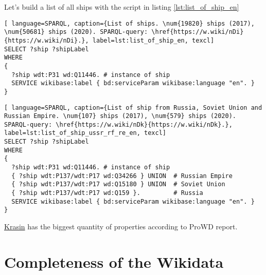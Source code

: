 Let's build a list of all ships with the script in listing \ref{lst:list_of_ship_en}

\begin{lstlisting}[ language=SPARQL, caption={List of ships. \num{19820} ships (2017), \num{50681} ships (2020). SPARQL-query: \href{https://w.wiki/nDi}{https://w.wiki/nDi}.}, label=lst:list_of_ship_en, texcl]
SELECT ?ship ?shipLabel
WHERE
{
  ?ship wdt:P31 wd:Q11446. # instance of ship
  SERVICE wikibase:label { bd:serviceParam wikibase:language "en". }
}
\end{lstlisting}

  
\begin{lstlisting}[ language=SPARQL, caption={List of ship from Russia, Soviet Union and Russian Empire. \num{107} ships (2017), \num{579} ships (2020). SPARQL-query: \href{https://w.wiki/nDk}{https://w.wiki/nDk}.}, label=lst:list_of_ship_ussr_rf_re_en, texcl]
SELECT ?ship ?shipLabel
WHERE
{
  ?ship wdt:P31 wd:Q11446. # instance of ship
  { ?ship wdt:P137/wdt:P17 wd:Q34266 } UNION  # Russian Empire
  { ?ship wdt:P137/wdt:P17 wd:Q15180 } UNION  # Soviet Union
  { ?ship wdt:P137/wdt:P17 wd:Q159 }.         # Russia
  SERVICE wikibase:label { bd:serviceParam wikibase:language "en". }
}
\end{lstlisting}

\href{https://www.wikidata.org/wiki/Q281147}{Krasin} has the biggest quantity of properties according to ProWD report\cite{ProWD_ru_ships}.
  
\begin{marginfigure}[0.0cm]
  {
    \setlength{\fboxsep}{0pt}%
    \setlength{\fboxrule}{1pt}%
  }
  \caption[Soviet destroyer project 7]{Postage stamp with a picture of Famous Soviet destroyer project 7.}%
  \label{fig:quiz_question_ship}%
\end{marginfigure}


\section{Completeness of the Wikidata}

\begin{marginfigure}[0.0cm]
  {
    \setlength{\fboxsep}{0pt}%
    \setlength{\fboxrule}{1pt}%
  }
  \caption[Graph of Wikidata objects' completeness]{Graph of \href{https://www.wikidata.org/wiki/Q11446}{ship (Q11446)} Wikidata objects' completeness. Gini coefficient equals 0.239. Data was collected with ProWD.id, 2020. The graph and Gini coefficient show that completeness is not uniform.}%
  \label{fig:prowd_ships-unbalanced}%
\end{marginfigure}

